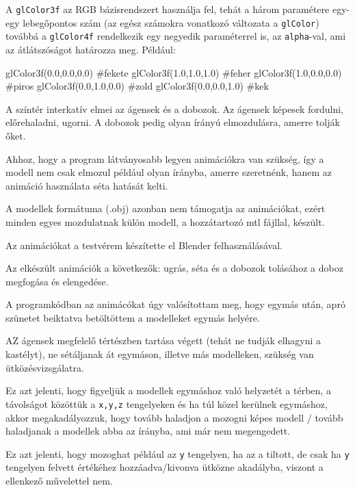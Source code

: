 A \texttt{glColor3f} az RGB bázisrendszert használja fel, tehát a három paramétere egy-egy lebegőpontos szám (az egész számokra vonatkozó változata a \texttt{glColor}) továbbá a \texttt{glColor4f} rendelkezik egy negyedik paraméterrel is, az \texttt{alpha}-val, ami az átlátszóságot határozza meg.
Például:
\begin{python}
glColor3f(0.0,0.0,0.0) #fekete
glColor3f(1.0,1.0,1.0) #feher
glColor3f(1.0,0.0,0.0) #piros
glColor3f(0.0,1.0,0.0) #zold
glColor3f(0.0,0.0,1.0) #kek
\end{python}


A színtér interkatív elmei az ágensek és a dobozok.
Az ágensek képesek fordulni, előrehaladni, ugorni.
A dobozok pedig olyan írányú elmozdulásra, amerre tolják őket.


Ahhoz, hogy a program látványosabb legyen animációkra van szükség, így a modell nem csak elmozul például olyan írányba, amerre szeretnénk, hanem az animáció használata séta hatását kelti.

A modellek formátuma (.obj) azonban nem támogatja az animációkat, ezért minden egyes mozdulatnak külön modell, a hozzátartozó mtl fájllal, készült.

Az animációkat a testvérem készítette el Blender felhasználásával.

Az elkészült animációk a következők: ugrás, séta és a dobozok tolásához a doboz megfogása és elengedése.

A programkódban az animácókat úgy valósítottam meg, hogy egymás után, apró szünetet beiktatva betöltöttem a modelleket egymás helyére.


AZ ágensek megfelelő tértészben tartása végett (tehát ne tudják elhagyni a kastélyt), ne sétáljanak át egymáson, illetve más modelleken, szükség van ütközésvizsgálatra.

Ez azt jelenti, hogy figyeljük a modellek egymáshoz való helyzetét a térben, a távolságot közöttük a \texttt{x,y,z} tengelyeken és ha túl közel kerülnek egymáshoz, akkor megakadályozzuk, hogy tovább haladjon a mozogni képes modell / tovább haladjanak a modellek abba az írányba, ami már nem megengedett.

Ez azt jelenti, hogy  mozoghat  például az \texttt{y} tengelyen, ha az a tiltott, de csak ha \texttt{y} tengelyen felvett értékéhez hozzáadva/kivonva ütközne akadályba, viszont a ellenkező művelettel nem.

